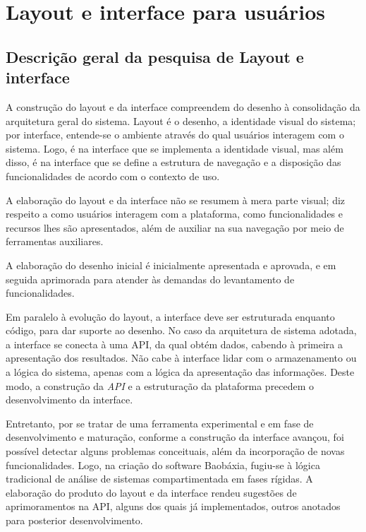 \chapter{Layout e interface para usuários}\label{Layout e interface para usuários}\lhead{\leftmark}

\section{Descrição geral da pesquisa de Layout e interface}
A construção do layout e da interface compreendem do desenho à
consolidação da arquitetura geral do sistema. Layout é o desenho, a
identidade visual do sistema; por interface, entende-se o ambiente
através do qual usuários interagem com o sistema. Logo, é na
interface que se implementa a identidade visual, mas além disso, é
na interface que se define a estrutura de navegação e a disposição
das funcionalidades de acordo com o contexto de uso.

A elaboração do layout e da interface não se resumem à mera parte
visual; diz respeito a como usuários interagem com a plataforma,
como funcionalidades e recursos lhes são apresentados, além de
auxiliar na sua navegação por meio de ferramentas auxiliares.

A elaboração do desenho inicial é inicialmente apresentada e
aprovada, e em seguida aprimorada para atender às demandas do
levantamento de funcionalidades.

Em paralelo à evolução do layout, a interface deve ser estruturada
enquanto código, para dar suporte ao desenho. No caso da arquitetura
de sistema adotada, a interface se conecta à uma API, da qual
obtém dados, cabendo à primeira a apresentação dos resultados. Não
cabe à interface lidar com o armazenamento ou a lógica do sistema,
apenas com a lógica da apresentação das informações. Deste modo,
a construção da \emph{API} e a estruturação da plataforma precedem o
desenvolvimento da interface.

Entretanto, por se tratar de uma ferramenta experimental e em fase
de desenvolvimento e maturação, conforme a construção da interface
avançou, foi possível detectar alguns problemas conceituais, além
da incorporação de novas funcionalidades. Logo, na criação do
software Baobáxia, fugiu-se à lógica tradicional de análise de
sistemas compartimentada em fases rígidas. A elaboração do produto
do layout e da interface rendeu sugestões de aprimoramentos na API,
alguns dos quais já implementados, outros anotados para posterior
desenvolvimento.

